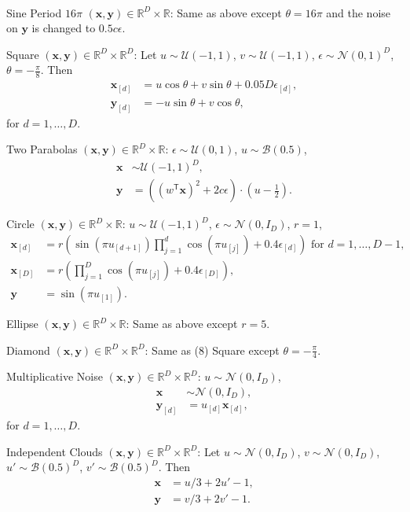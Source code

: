 \documentclass[11pt]{article}
\providecommand{\mb}[1]{\boldsymbol{#1}}
\providecommand{\mc}[1]{\mathcal{#1}}
\newcommand{\Real}{\mathbb{R}}
\newcommand{\T}{^{\ensuremath{\mathsf{T}}}}           %
\begin{document}
\begin{compactenum}
\begin{align*}
\end{align*}
\item Sine Period $16\pi$ $(\mb{x},\mb{y}) \in \Real^{D} \times \Real$: Same as above except $\theta=16\pi$ and the noise on $\mb{y}$ is changed to $0.5c\epsilon$.
\item Square $(\mb{x},\mb{y}) \in \Real^{D} \times \Real^{D}$: Let $u \sim \mc{U}(-1,1)$, $v \sim \mc{U}(-1,1)$, $\epsilon \sim \mc{N}(0,1)^{D}$, $\theta=-\frac{\pi}{8}$. Then
\begin{align*}
\mb{x}_{[d]}&=u \cos\theta + v \sin\theta + 0.05 D\epsilon_{[d]},\\
\mb{y}_{[d]}&=-u \sin\theta + v \cos\theta,
\end{align*}
for $d=1,\ldots,D$.
\item Two Parabolas $(\mb{x},\mb{y}) \in \Real^{D} \times \Real$: $\epsilon \sim \mc{U}(0,1)$, $u \sim \mc{B}(0.5)$,
\begin{align*}
\mb{x} &\sim \mc{U}(-1,1)^{D},\\
\mb{y}&=\left( (w\T \mb{x})^2  + 2c\epsilon\right) \cdot (u-\tfrac{1}{2}).
\end{align*}
\item Circle $(\mb{x},\mb{y}) \in \Real^{D} \times \Real$: $u \sim \mc{U}(-1,1)^{D}$, $\epsilon \sim \mc{N}(0, I_{D})$, $r=1$,
\begin{align*}
\mb{x}_{[d]}&=r \left(\sin(\pi u_{[d+1]})  \prod_{j=1}^{d} \cos(\pi u_{[j]})+0.4 \epsilon_{[d]}\right) \mbox{ for $d=1,\ldots,D-1$},\\
\mb{x}_{[D]}&=r \left(\prod_{j=1}^{D} \cos(\pi u_{[j]})+0.4 \epsilon_{[D]}\right),\\
\mb{y}&= \sin(\pi u_{[1]}).
\end{align*}
\item Ellipse $(\mb{x},\mb{y}) \in \Real^{D} \times \Real$: Same as above except $r=5$.
\item Diamond $(\mb{x},\mb{y}) \in \Real^{D} \times \Real^{D}$: Same as (8) Square except $\theta=-\frac{\pi}{4}$.
\item Multiplicative Noise $(\mb{x},\mb{y}) \in \Real^{D} \times \Real^{D}$: $u \sim \mc{N}(0, I_{D})$, 
\begin{align*}
\mb{x} &\sim \mc{N}(0, I_{D}),\\
\mb{y}_{[d]}&=u_{[d]}\mb{x}_{[d]},
\end{align*}
for $d=1,\ldots,D$.
\item Independent Clouds $(\mb{x},\mb{y}) \in \Real^{D} \times \Real^{D}$: Let $u \sim \mc{N}(0,I_{D})$, $v \sim \mc{N}(0,I_{D})$, $u' \sim \mc{B}(0.5)^{D}$, $v' \sim \mc{B}(0.5)^{D}$. Then
\begin{align*}
\mb{x}&=u/3+2u'-1,\\
\mb{y}&=v/3+2v'-1.
\end{align*}
\end{compactenum}
\end{document}
